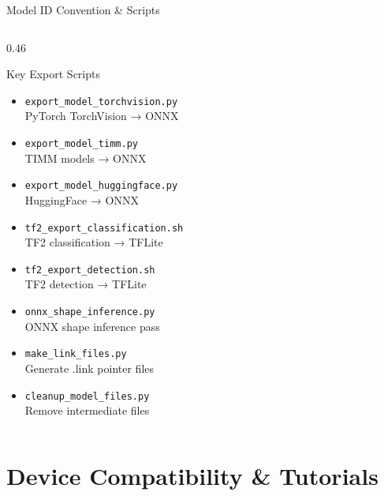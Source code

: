 \documentclass[aspectratio=169,12pt]{beamer}
\begin{document}
\begin{frame}{Model ID Convention \& Scripts}
\begin{columns}[T]
    \begin{column}{0.46\textwidth}
      \begin{exampleblock}{Key Export Scripts}
        \begin{itemize}\scriptsize
          \item \texttt{export\_model\_torchvision.py}\\
                PyTorch TorchVision → ONNX
          \item \texttt{export\_model\_timm.py}\\
                TIMM models → ONNX
          \item \texttt{export\_model\_huggingface.py}\\
                HuggingFace → ONNX
          \item \texttt{tf2\_export\_classification.sh}\\
                TF2 classification → TFLite
          \item \texttt{tf2\_export\_detection.sh}\\
                TF2 detection → TFLite
          \item \texttt{onnx\_shape\_inference.py}\\
                ONNX shape inference pass
          \item \texttt{make\_link\_files.py}\\
                Generate .link pointer files
          \item \texttt{cleanup\_model\_files.py}\\
                Remove intermediate files
        \end{itemize}
      \end{exampleblock}
    \end{column}
  \end{columns}
\end{frame}

\section{Device Compatibility \& Tutorials}
\end{document}
